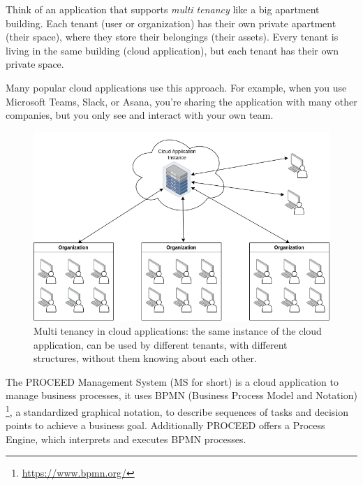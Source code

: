 
Think of an application that supports \textit{multi tenancy} like a big apartment building.
Each tenant (user or organization) has their
own private apartment (their space), where they store their belongings (their assets).
Every tenant is living in the same building (cloud application), but each tenant has their
own private space.

Many popular cloud applications use this approach. For example, when you use Microsoft Teams,
Slack, or Asana, you're sharing the application with many other companies, but you only
see and interact with your own team.

\begin{figure}[H]
	\centering
	\includegraphics[scale=0.45]{images/mt-cloud-services.png}
	\caption{Multi tenancy in cloud applications: the same instance of the cloud
		application, can be used by different tenants, with different structures, without them knowing about each other.}
	\vspace{-1em} %
	\label{fig:multi-tenant=cloud-applications}
	\vspace{-1em} %
\end{figure}

The PROCEED Management System (MS for short)
is a cloud application to manage business processes,
it uses BPMN (Business Process Model and Notation) \footnote{\url{https://www.bpmn.org/}},
a standardized graphical notation,
to describe sequences of tasks and decision points to achieve a business goal.
Additionally PROCEED offers a Process Engine, which interprets and executes BPMN processes.

